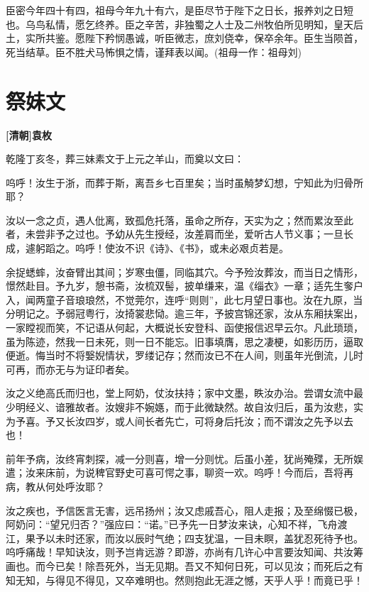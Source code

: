 \documentclass[UTF8,titlepage,oneside]{ctexbook}
\begin{document}
臣密今年四十有四，祖母今年九十有六，是臣尽节于陛下之日长，报养刘之日短也。乌鸟私情，愿乞终养。臣之辛苦，非独蜀之人士及二州牧伯所见明知，皇天后土，实所共鉴。愿陛下矜悯愚诚，听臣微志，庶刘侥幸，保卒余年。臣生当陨首，死当结草。臣不胜犬马怖惧之情，谨拜表以闻。(祖母一作：祖母刘)


\chapter*{祭妹文}
\begin{center}
	\textbf{[清朝]袁枚}
\end{center}

乾隆丁亥冬，葬三妹素文于上元之羊山，而奠以文曰：


呜呼！汝生于浙，而葬于斯，离吾乡七百里矣；当时虽觭梦幻想，宁知此为归骨所耶？


汝以一念之贞，遇人仳离，致孤危托落，虽命之所存，天实为之；然而累汝至此者，未尝非予之过也。予幼从先生授经，汝差肩而坐，爱听古人节义事；一旦长成，遽躬蹈之。呜呼！使汝不识《诗》、《书》，或未必艰贞若是。


余捉蟋蟀，汝奋臂出其间；岁寒虫僵，同临其穴。今予殓汝葬汝，而当日之情形，憬然赴目。予九岁，憩书斋，汝梳双髻，披单缣来，温《缁衣》一章；适先生奓户入，闻两童子音琅琅然，不觉莞尔，连呼“则则”，此七月望日事也。汝在九原，当分明记之。予弱冠粤行，汝掎裳悲恸。逾三年，予披宫锦还家，汝从东厢扶案出，一家瞠视而笑，不记语从何起，大概说长安登科、函使报信迟早云尔。凡此琐琐，虽为陈迹，然我一日未死，则一日不能忘。旧事填膺，思之凄梗，如影历历，逼取便逝。悔当时不将嫛婗情状，罗缕记存；然而汝已不在人间，则虽年光倒流，儿时可再，而亦无与为证印者矣。


汝之义绝高氏而归也，堂上阿奶，仗汝扶持；家中文墨，眣汝办治。尝谓女流中最少明经义、谙雅故者。汝嫂非不婉嫕，而于此微缺然。故自汝归后，虽为汝悲，实为予喜。予又长汝四岁，或人间长者先亡，可将身后托汝；而不谓汝之先予以去也！


前年予病，汝终宵刺探，减一分则喜，增一分则忧。后虽小差，犹尚殗殜，无所娱遣；汝来床前，为说稗官野史可喜可愕之事，聊资一欢。呜呼！今而后，吾将再病，教从何处呼汝耶？


汝之疾也，予信医言无害，远吊扬州；汝又虑戚吾心，阻人走报；及至绵惙已极，阿奶问：“望兄归否？”强应曰：“诺。”已予先一日梦汝来诀，心知不祥，飞舟渡江，果予以未时还家，而汝以辰时气绝；四支犹温，一目未瞑，盖犹忍死待予也。呜呼痛哉！早知诀汝，则予岂肯远游？即游，亦尚有几许心中言要汝知闻、共汝筹画也。而今已矣！除吾死外，当无见期。吾又不知何日死，可以见汝；而死后之有知无知，与得见不得见，又卒难明也。然则抱此无涯之憾，天乎人乎！而竟已乎！
\end{document}
